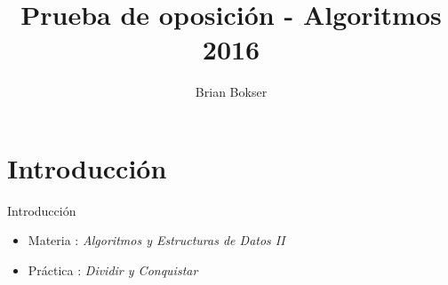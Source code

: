 \documentclass[pdf]{beamer}
\title[Prueba de oposición] %
{Prueba de oposición - Algoritmos 2016}
\author[Brian Bokser] %
{Brian Bokser}
\institute[UBA-FCEN] %
{
  Facultad de Ciencias Exactas y Naturales\\
  Universidad de Buenos Aires
}
\begin{document}
\begin{frame}
  \titlepage
\end{frame}



\section{Introducci\'on}

\begin{frame}{Introducci\'on}
    \begin{itemize}
	\item Materia :  \emph{Algoritmos y Estructuras de Datos II}
	\vspace{2em}
	\item Práctica : \emph{Dividir y Conquistar}

    \end{itemize}

\end{frame}

    
    
\end{document}
